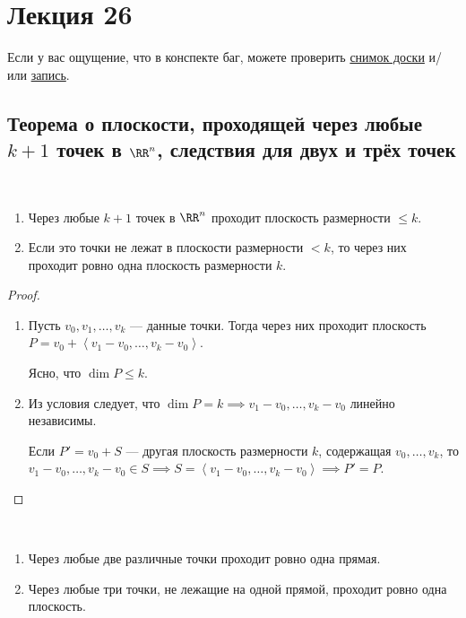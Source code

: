 \section{Лекция 26} 

Если у вас ощущение, что в конспекте баг, можете проверить \href{https://www.dropbox.com/s/fty6fb2vuyugzdk/LA_19-20_osn_Lecture26.svg?dl=0}{снимок доски} и/или \href{https://youtu.be/U-UZGNDM1SA}{запись}.

\subsection{Теорема о плоскости, проходящей через любые $k+1$ точек в $\RR^n$, следствия для двух и трёх точек}

\begin{theorem}~
    \begin{enumerate}[label=\alph*)]
    \item Через любые $k + 1$ точек в $\RR^n$ проходит плоскость размерности $\leq k$.
    \item Если это точки не лежат в плоскости размерности $<k$, то через них проходит ровно одна плоскость размерности $k$.
    \end{enumerate}
\end{theorem}

\begin{proof}~
    \begin{enumerate}[label=\alph*)]
        \item Пусть $v_0, v_1, \dots, v_k$ --- данные точки. Тогда через них проходит плоскость $P = v_0 + \left< v_1 - v_0, \dots, v_k - v_0 \right>$.

            Ясно, что $\dim P \leq k$.

        \item Из условия следует, что $\dim P = k \implies v_1 - v_0, \dots, v_k - v_0$ линейно независимы.

            Если $P' = v_0 + S$ --- другая плоскость размерности $k$, содержащая $v_0, \dots, v_k$, то $v_1 - v_0, \dots, v_k - v_0 \in S \implies S = \left< v_1 - v_0, \dots, v_k - v_0 \right> \implies P' = P$.
            \qedhere
    \end{enumerate}
\end{proof}

\begin{corollary}~
    \begin{enumerate}
    \item Через любые две различные точки проходит ровно одна прямая.
    \item Через любые три точки, не лежащие на одной прямой, проходит ровно одна плоскость.
    \end{enumerate}
\end{corollary}


